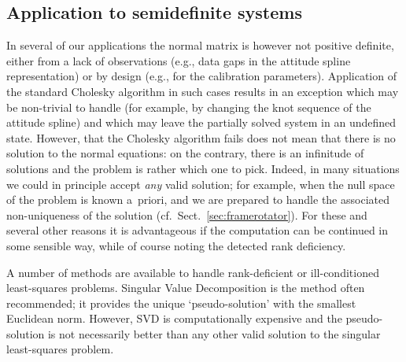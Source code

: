 \documentclass[structabstract]{aa}
\begin{document}
\begin{algorithm}[t]
\caption{Returns $\vec{x}$ such that $\vec{U}\vec{x}=\vec{y}$, where
$\vec{U}\in\mathbb R^{n\times n}$ is upper-triangular and $\vec{y}\in\mathbb R^{n}$.}
\label{algo:C3}
\begin{algorithmic}[1]
	\ELSE
	\ENDIF
\ENDFOR
\end{algorithmic}
\end{algorithm}



\subsection{Application to semidefinite systems}

In several of our applications the normal matrix is however not 
positive definite, either from a lack of observations (e.g., data gaps in the 
attitude spline representation) or by design (e.g., for the calibration 
parameters). Application of the standard Cholesky algorithm in such 
cases results in an exception which may be non-trivial to handle
(for example, by changing the knot sequence of the attitude spline) 
and which may leave the partially solved system in an undefined 
state. However, that the Cholesky algorithm fails does not mean that 
there is no solution to the normal equations: on the contrary, there 
is an infinitude of solutions and the problem is rather which one to 
pick. Indeed, in many situations we could in principle accept \emph{any} 
valid solution; for example, when the null space of the problem is 
known a~priori, and we are prepared to handle the associated 
non-uniqueness of the solution (cf.~Sect.~\ref{sec:framerotator}). 
For these and several other reasons it is advantageous if the 
computation can be continued in some sensible way, while of
course noting the detected rank deficiency. 

A number of methods are available to handle rank-deficient or
ill-conditioned least-squares problems. Singular Value Decomposition
\citep[SVD; e.g.,][]{book:bjork-1996,golu+96,book:nr3} is the method
often recommended; it provides the unique `pseudo-solution' with
the smallest Euclidean norm. However, SVD is computationally 
expensive and the pseudo-solution is not necessarily better than 
any other valid solution to the singular least-squares problem.
\end{document}
